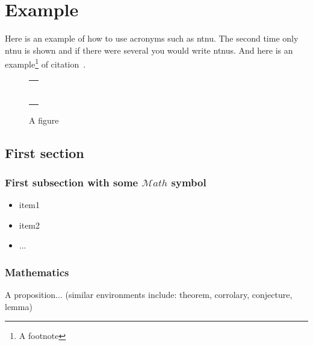 \chapter{Example}
\label{ch:example} 

Here is an example of how to use acronyms such as \gls{ntnu}. The second time only \gls{ntnu} is shown and if there were several you would write \glspl{ntnu}. And here is an example\footnote{A footnote} of citation~\cite{Author:year:XYZ}.

\Blindtext[3][1]

\begin{figure}
\centering
\begin{tabular}{@{}c@{}}
\rule{.5\textwidth}{.5\textwidth} \\
\end{tabular}
\caption{\label{fig:example}A figure}
\end{figure}

\section{First section}\label{sec:first_section}

\subsection{First subsection with some \texorpdfstring{$\mathcal{M}ath$}{Math} symbol}\label{sec:first_ssection}

\blindtext
\begin{itemize}[topsep=-1em,parsep=0em,itemsep=0em] %
 \item item1
 \item item2
 \item ...
\end{itemize}

\subsection{Mathematics}

\blindmathtrue
\blindtext

\begin{proposition}\label{def:a_proposition}
A proposition... (similar environments include: theorem, corrolary, conjecture, lemma)

\end{proposition}

